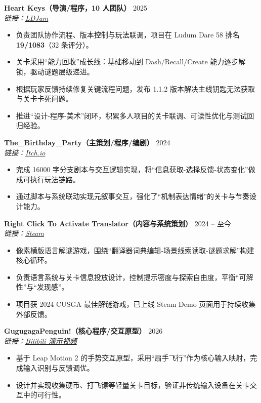 \documentclass[11pt,a4paper]{ctexart}
\begin{document}
\textbf{Heart Keys（导演/程序，10 人团队）} \hfill 2025\\
\textit{链接：\href{https://ldjam.com/events/ludum-dare/58/heart-keys}{LDJam}}\\
\begin{itemize}[leftmargin=1.3em,itemsep=2pt,topsep=2pt]
  \item 负责团队协作流程、版本控制与玩法联调，项目在 Ludum Dare 58 排名 \textbf{19/1083}（32 条评分）。
  \item 关卡采用“能力回收”成长线：基础移动到 Dash/Recall/Create 能力逐步解锁，驱动谜题层级递进。
  \item 根据玩家反馈持续修复关键流程问题，发布 1.1.2 版本解决主线钥匙无法获取与关卡卡死问题。
  \item 推进“设计-程序-美术”闭环，积累多人项目的关卡联调、可读性优化与测试回归经验。
\end{itemize}

\textbf{The\_Birthday\_Party（主策划/程序/编剧）} \hfill 2024\\
\textit{链接：\href{https://hidden61ade.itch.io/the-birthday-party}{Itch.io}}\\
\begin{itemize}[leftmargin=1.3em,itemsep=2pt,topsep=2pt]
  \item 完成 16000 字分支剧本与交互逻辑实现，将“信息获取-选择反馈-状态变化”做成可执行玩法链路。
  \item 通过脚本与系统联动实现元叙事交互，强化了“机制表达情绪”的关卡与节奏设计能力。
\end{itemize}

\textbf{Right Click To Activate Translator（内容与系统策划）} \hfill 2024 -- 至今\\
\textit{链接：\href{https://store.steampowered.com/app/3128590/_/}{Steam}}\\
\begin{itemize}[leftmargin=1.3em,itemsep=2pt,topsep=2pt]
  \item 像素横版语言解谜游戏，围绕“翻译器词典编辑-场景线索读取-谜题求解”构建核心循环。
  \item 负责语言系统与关卡信息投放设计，控制提示密度与探索自由度，平衡“可解性”与“发现感”。
  \item 项目获 2024 CUSGA 最佳解谜游戏，已上线 Steam Demo 页面用于持续收集外部反馈。
\end{itemize}

\textbf{GugugagaPenguin!（核心程序/交互原型）} \hfill 2026\\
\textit{链接：\href{https://www.bilibili.com/video/BV1DL9CBzEej/}{Bilibili 演示视频}}\\
\begin{itemize}[leftmargin=1.3em,itemsep=2pt,topsep=2pt]
  \item 基于 Leap Motion 2 的手势交互原型，采用“扇手飞行”作为核心输入映射，完成输入识别与反馈调优。
  \item 设计并实现收集硬币、打飞镖等轻量关卡目标，验证非传统输入设备在关卡交互中的可行性。
\end{itemize}
\end{document}
